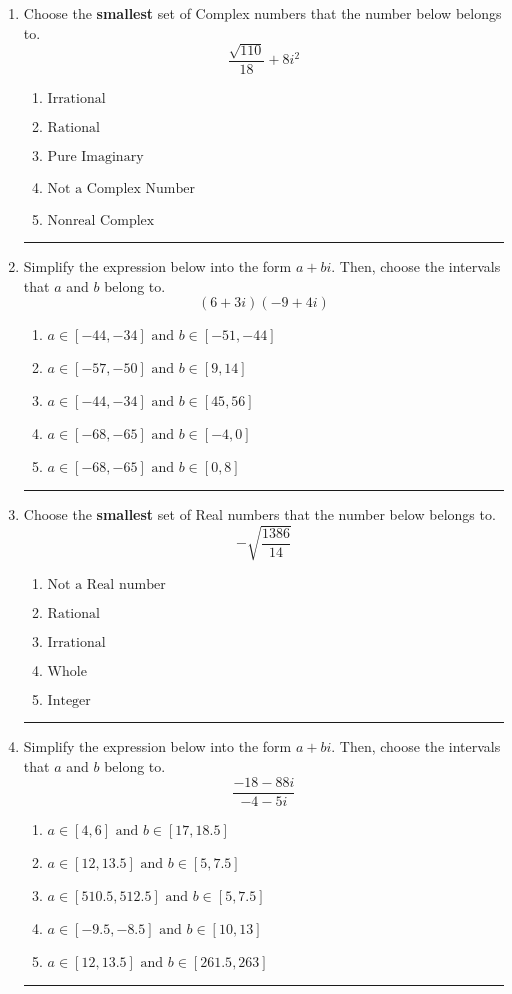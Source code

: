 \documentclass[14pt]{extbook}
\newcommand{\litem}[1]{\item#1\hspace*{-1cm}\rule{\textwidth}{0.4pt}}
\begin{document}
\begin{enumerate}
{\begin{enumerate}[label=\Alph*.]
\end{enumerate} }
\litem{
Choose the \textbf{smallest} set of Complex numbers that the number below belongs to.\[ \frac{\sqrt{110}}{18}+8i^2 \]\begin{enumerate}[label=\Alph*.]
\item \( \text{Irrational} \)
\item \( \text{Rational} \)
\item \( \text{Pure Imaginary} \)
\item \( \text{Not a Complex Number} \)
\item \( \text{Nonreal Complex} \)

\end{enumerate} }
\litem{
Simplify the expression below into the form $a+bi$. Then, choose the intervals that $a$ and $b$ belong to.\[ (6 + 3 i)(-9 + 4 i) \]\begin{enumerate}[label=\Alph*.]
\item \( a \in [-44, -34] \text{ and } b \in [-51, -44] \)
\item \( a \in [-57, -50] \text{ and } b \in [9, 14] \)
\item \( a \in [-44, -34] \text{ and } b \in [45, 56] \)
\item \( a \in [-68, -65] \text{ and } b \in [-4, 0] \)
\item \( a \in [-68, -65] \text{ and } b \in [0, 8] \)

\end{enumerate} }
\litem{
Choose the \textbf{smallest} set of Real numbers that the number below belongs to.\[ -\sqrt{\frac{1386}{14}} \]\begin{enumerate}[label=\Alph*.]
\item \( \text{Not a Real number} \)
\item \( \text{Rational} \)
\item \( \text{Irrational} \)
\item \( \text{Whole} \)
\item \( \text{Integer} \)

\end{enumerate} }
\litem{
Simplify the expression below into the form $a+bi$. Then, choose the intervals that $a$ and $b$ belong to.\[ \frac{-18 - 88 i}{-4 - 5 i} \]\begin{enumerate}[label=\Alph*.]
\item \( a \in [4, 6] \text{ and } b \in [17, 18.5] \)
\item \( a \in [12, 13.5] \text{ and } b \in [5, 7.5] \)
\item \( a \in [510.5, 512.5] \text{ and } b \in [5, 7.5] \)
\item \( a \in [-9.5, -8.5] \text{ and } b \in [10, 13] \)
\item \( a \in [12, 13.5] \text{ and } b \in [261.5, 263] \)


\end{enumerate}}
\end{enumerate}
\end{document}
